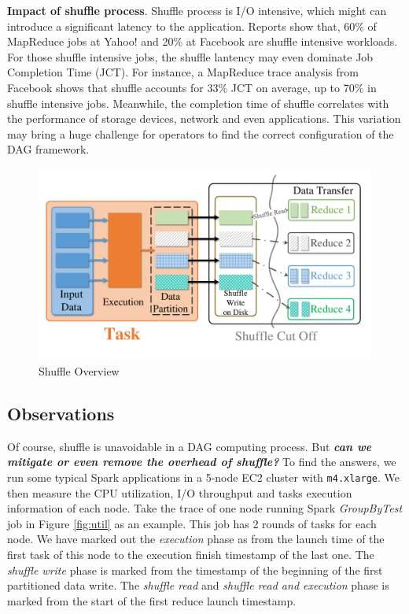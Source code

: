 
\textbf{Impact of shuffle process}. Shuffle process is I/O intensive, which might can introduce a significant latency to the application. Reports show that, 60\% of MapReduce jobs at Yahoo!
and 20\% at Facebook are shuffle intensive workloads\cite{shufflewatcher}. For those shuffle intensive jobs, the shuffle lantency may even dominate Job Completion Time (JCT). 
For instance, a MapReduce trace analysis from Facebook shows that shuffle accounts for 33\% JCT on average, up to 70\% in shuffle intensive jobs\cite{managing}.
Meanwhile, the completion time of shuffle correlates with the performance of storage devices, network and even applications. 
This variation may bring a huge challenge for operators to find the correct configuration of the DAG framework.
\begin{figure}
	\centering
	\includegraphics[width=\linewidth]{fig/shuffle_process}
	\caption{Shuffle Overview}
	\label{fig:shuffle_process}
\end{figure}

\subsection{Observations} \label{observation}
Of course, shuffle is unavoidable in a DAG computing process. But \textbf{\textit{can we mitigate or even remove the overhead of shuffle?}} To find the answers, we run some typical Spark applications in a 5-node EC2 cluster with \texttt{m4.xlarge}. We then measure the CPU utilization, I/O throughput and tasks execution information of each node. Take the trace of one node running Spark \textit{GroupByTest} job in Figure \ref{fig:util} as an example. This job has 2 rounds of tasks for each node. 
We have marked out the \textit{execution} phase as from the launch time of the first task of this node to the execution finish timestamp of the last one. The \textit{shuffle write} phase is marked from the timestamp of the beginning of the first partitioned data write. The \textit{shuffle read} and \textit{shuffle read and execution} phase is marked from the start of the first reduce launch timestamp.

